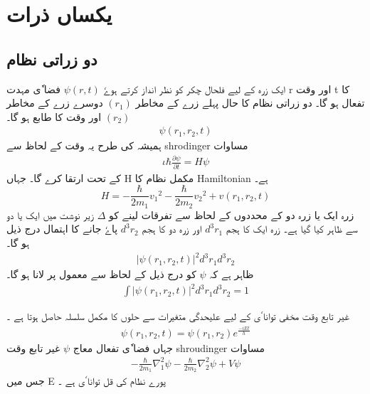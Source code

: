 \documentclass{book}
\begin{document}
\setcounter{chapter}{4}
\chapter{ یکساں ذرات } 
 

\section{ دو   زراتی نظام} 

ایک زرہ کے لیے فلحال چکر کو نظر انداز کرتے ہوےٗ  
$ \psi ( r , t ) $
فضا ٗی مہدت r اور وقت t کا تفعال ہو گا۔ دو زراتی نظام کا حال پہلے زرے کے مخاطر 
$ ( r_1 ) $
دوسرے زرے کے مخاطر 
$ ( r_2 ) $
اور وقت کا طابع ہو گا۔ 
\begin{align}   
\psi ( r_1 , r_2 , t ) 
\end{align}
 ہمیشہ کی طرح یہ وقت کے لحاظ سے shrodinger مساوات 
\begin{align}
\iota \hbar \frac{ \partial \psi }{ \partial t } = H \psi
\end{align}
کے تحت ارتقا کرے گا۔ جہاں H مکمل  نظام کا Hamiltonian  ہے۔
\begin{equation}
H = - \frac{ \hbar }{ 2 m_1 } {v_1}^2  -  \frac{ \hbar }{ 2 m_2 } { v_2 }^2 +  v( r_1 , r_2 , t )
\end{equation}
زرہ ایک یا زرہ دو کے محددوں کے لحاظ سے  تفرقات لینے کو 
$ \Delta $
زیر نوشت میں ایک یا دو سے ظاہر کیا گیا ہے۔ زرہ ایک کا ہجم 
$ d^3 r_1 $
اور زرہ دو کا ہجم
$ d^3 r_2 $
پاےٗ جانے کا اہتمال درج ذیل ہو گا۔ 
\begin{align}
| \psi ( r_1 , r_2 , t ) |^2 { d^3 } { r_1 }  { d^3 } { r_2 }
\end{align}
ظاہر ہے کہ 
$ \psi $
کو درج ذیل کے لحاظ سے معمول پر لانا ہو گا۔ 
\begin{align}
\int | \psi ( r_1 , r_2 , t ) |^2 { d^3 } { r_1 } { d^3 } { r_2 } = 1
\end{align}

\newpage

غیر تابع وقت مخفی توانا ٗی کے لیے علیحدگی  متغیرات  سے حلوں کا مکمل سلسلہ حاصل ہوتا ہے ۔ 
\begin{align}
\psi ( r_1 , r_2 , t ) =  \psi ( r_1 , r_2 ) {e}^\frac{ - i E t }{h}  
\end{align}
جہاں فضا ٗی تفعال معاج 
$ \psi $
غیر تابع وقت shroudinger مساوات 
\begin{align}
-\frac{ \hbar }{ 2 m_1 }  {\nabla_1^2} { \psi } - \frac{ \hbar }{ 2 m_2 } \nabla_2^2 { \psi } + V \psi 
\end{align}
جس میں E پورے نظام کی قل توانا ٗی ہے ۔ 
\end{document}
